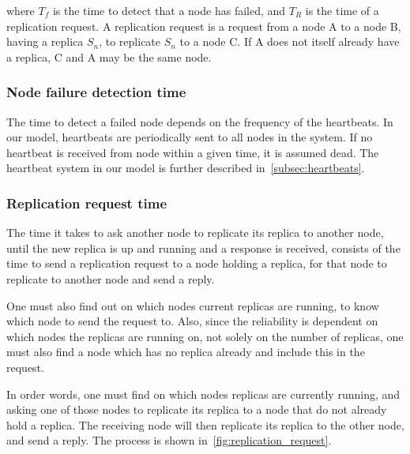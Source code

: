 \documentclass{cslthse-msc}
\begin{document}
where $T_f$ is the time to detect that a node has failed, and $T_R$ is the time of a replication request. A replication request is a request from a node A to a node B, having a replica $S_n$, to replicate $S_n$ to a node C. If A does not itself already have a replica, C and A may be the same node.

\subsubsection{Node failure detection time} \label{sec:node_failure_detection_time}
The time to detect a failed node depends on the frequency of the heartbeats. In our model, heartbeats are periodically sent to all nodes in the system. If no heartbeat is received from node within a given time, it is assumed dead. The heartbeat system in our model is further described in~\cref{subsec:heartbeats}.

\subsubsection{Replication request time} \label{sec:replication_time}
The time it takes to ask another node to replicate its replica to another node, until the new replica is up and running and a response is received, consists of the time to send a replication request to a node holding a replica, for that node to replicate to another node and send a reply.

One must also find out on which nodes current replicas are running, to know which node to send the request to. Also, since the reliability is dependent on which nodes the replicas are running on, not solely on the number of replicas, one must also find a node which has no replica already and include this in the request.

In order words, one must find on which nodes replicas are currently running, and asking one of those nodes to replicate its replica to a node that do not already hold a replica. The receiving node will then replicate its replica to the other node, and send a reply. The process is shown in~\cref{fig:replication_request}.
\end{document}
